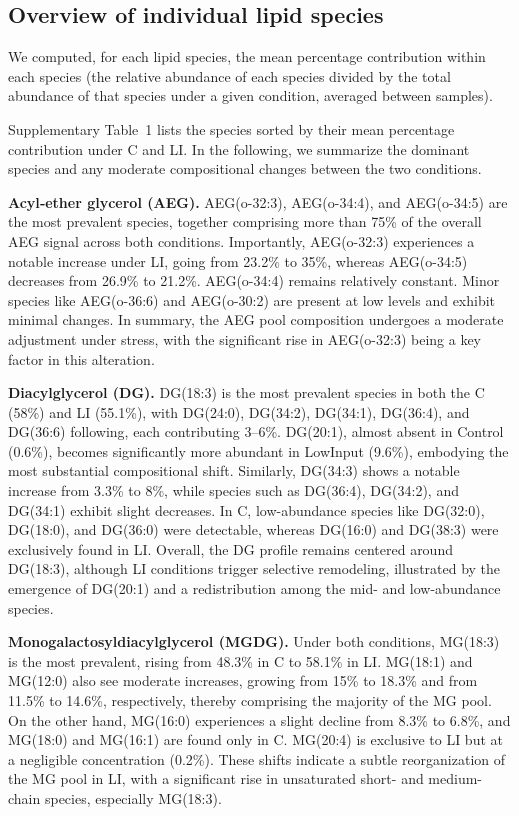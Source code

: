 \documentclass[10pt,letterpaper]{article}
\begin{document}
\subsection*{Overview of individual lipid species}
We computed, for each lipid species, the mean percentage contribution within each species (the relative abundance of each species divided by the total abundance of that species under a given condition, averaged between samples). 

Supplementary Table~1 lists the species sorted by their mean percentage contribution under C and LI. In the following, we summarize the dominant species and any moderate compositional changes between the two conditions.

\bigskip

\textbf{Acyl‐ether glycerol (AEG).}  
AEG(o-32:3), AEG(o-34:4), and AEG(o-34:5) are the most prevalent species, together comprising more than 75\% of the overall AEG signal across both conditions. Importantly, AEG(o-32:3) experiences a notable increase under LI, going from 23.2\% to 35\%, whereas AEG(o-34:5) decreases from 26.9\% to 21.2\%. AEG(o-34:4) remains relatively constant. Minor species like AEG(o-36:6) and AEG(o-30:2) are present at low levels and exhibit minimal changes. In summary, the AEG pool composition undergoes a moderate adjustment under stress, with the significant rise in AEG(o-32:3) being a key factor in this alteration.

\textbf{Diacylglycerol (DG).}  
DG(18:3) is the most prevalent species in both the C (58\%) and LI (55.1\%), with DG(24:0), DG(34:2), DG(34:1), DG(36:4), and DG(36:6) following, each contributing 3–6\%. DG(20:1), almost absent in Control (0.6\%), becomes significantly more abundant in LowInput (9.6\%), embodying the most substantial compositional shift. Similarly, DG(34:3) shows a notable increase from 3.3\% to 8\%, while species such as DG(36:4), DG(34:2), and DG(34:1) exhibit slight decreases. In C, low-abundance species like DG(32:0), DG(18:0), and DG(36:0) were detectable, whereas DG(16:0) and DG(38:3) were exclusively found in LI. Overall, the DG profile remains centered around DG(18:3), although LI conditions trigger selective remodeling, illustrated by the emergence of DG(20:1) and a redistribution among the mid- and low-abundance species.


\textbf{Monogalactosyldiacylglycerol (MGDG).} 
Under both conditions, MG(18:3) is the most prevalent, rising from 48.3\% in C to 58.1\% in LI. MG(18:1) and MG(12:0) also see moderate increases, growing from 15\% to 18.3\% and from 11.5\% to 14.6\%, respectively, thereby comprising the majority of the MG pool. On the other hand, MG(16:0) experiences a slight decline from 8.3\% to 6.8\%, and MG(18:0) and MG(16:1) are found only in C. MG(20:4) is exclusive to LI but at a negligible concentration (0.2\%). These shifts indicate a subtle reorganization of the MG pool in LI, with a significant rise in unsaturated short- and medium-chain species, especially MG(18:3).
\end{document}
